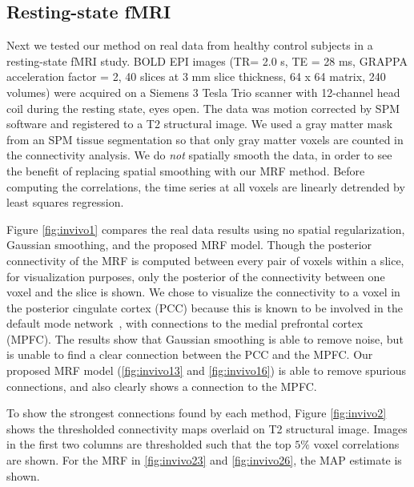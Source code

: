 \subsection{Resting-state fMRI} 
Next we tested our method on real data from healthy control subjects in a
resting-state fMRI study. BOLD EPI images (TR= 2.0 s, TE = 28 ms, GRAPPA
acceleration factor = 2, 40 slices at 3 mm slice thickness, 64 x 64 matrix, 240
volumes) were acquired on a Siemens 3 Tesla Trio scanner with 12-channel head
coil during the resting state, eyes open. The data was motion corrected by SPM
software and registered to a T2 structural image. We used a gray matter mask
from an SPM tissue segmentation so that only gray matter voxels are counted in
the connectivity analysis. We do \emph{not} spatially smooth the data, in order
to see the benefit of replacing spatial smoothing with our MRF method. Before
computing the correlations, the time series at all voxels are linearly detrended
by least squares regression.

Figure \ref{fig:invivo1} compares the real data results using no spatial
regularization, Gaussian smoothing, and the proposed MRF model. Though the
posterior connectivity of the MRF is computed between every pair of voxels
within a slice, for visualization purposes, only the posterior of the
connectivity between one voxel and the slice is shown. We chose to visualize
the connectivity to a voxel in the posterior cingulate cortex (PCC) because
this is known to be involved in the default mode
network~\cite{raichle2001default}, with connections to the medial prefrontal
cortex (MPFC). The results show that Gaussian smoothing is able to remove
noise, but is unable to find a clear connection between the PCC and the
MPFC. Our proposed MRF model (\ref{fig:invivo13} and \ref{fig:invivo16}) is
able to remove spurious connections, and also clearly shows a connection to
the MPFC.

To show the strongest connections found by each method, Figure
\ref{fig:invivo2} shows the thresholded connectivity maps overlaid on T2
structural image. Images in the first two columns are thresholded such that
the top $5\%$ voxel correlations are shown. For the MRF in \ref{fig:invivo23}
and \ref{fig:invivo26}, the MAP estimate is shown.


